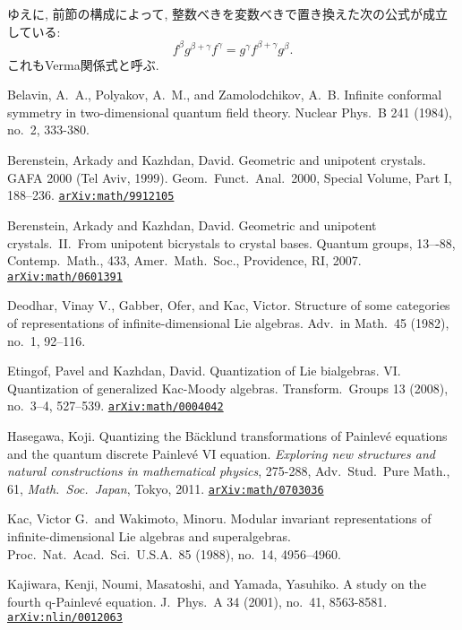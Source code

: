 \documentclass[12pt,twoside,dvipdfm]{msjproc}
\newcommand\arxivref[1]{\href{http://arxiv.org/abs/#1}{\tt arXiv:#1}}
\theoremstyle{definition} %
\theoremstyle{definition} %
\theoremstyle{definition} %
\numberwithin{theorem}{section}
\numberwithin{equation}{section}
\numberwithin{figure}{section}
\numberwithin{table}{section}
\begin{document}
ゆえに, 前節の構成によって, 
整数べきを変数べきで置き換えた次の公式が成立している:
\begin{equation*}
  f^\beta g^{\beta+\gamma} f^\gamma
 =g^\gamma f^{\beta+\gamma} g^\beta.
\end{equation*}
これもVerma関係式と呼ぶ.


\begin{thebibliography}{99}

Belavin, A.\ A., Polyakov, A.\ M., and Zamolodchikov, A.\ B. 
Infinite conformal symmetry in two-dimensional quantum field theory. 
Nuclear Phys.\ B 241 (1984), no.~2, 333-380.

Berenstein, Arkady and Kazhdan, David. 
Geometric and unipotent crystals. 
GAFA 2000 (Tel Aviv, 1999).  
Geom.\ Funct.\ Anal.\  2000,  Special Volume, Part I, 188--236.
\arxivref{math/9912105}

Berenstein, Arkady and Kazhdan, David. 
Geometric and unipotent crystals.\ II.\ 
From unipotent bicrystals to crystal bases. 
Quantum groups, 13–-88, Contemp.\ Math., 433, 
Amer.\ Math.\ Soc., Providence, RI, 2007.
\arxivref{math/0601391}

Deodhar, Vinay V., Gabber, Ofer, and Kac, Victor. 
Structure of some categories of representations 
of infinite-dimensional Lie algebras. 
Adv.\ in Math.\ 45 (1982), no.~1, 92--116.

Etingof, Pavel and Kazhdan, David. 
Quantization of Lie bialgebras. 
VI. Quantization of generalized Kac-Moody algebras. 
Transform.\ Groups 13 (2008), no.~3--4, 527--539. 
\arxivref{math/0004042}

Hasegawa, Koji.
Quantizing the B\"acklund transformations of Painlev\'e equations and 
the quantum discrete Painlev\'e VI equation. 
{\em Exploring new structures and natural constructions in mathematical physics}, 275-288, 
Adv.\ Stud.\ Pure Math., 61, {\em Math.\ Soc.\ Japan}, Tokyo, 2011.
\arxivref{math/0703036}

Kac, Victor G.\ and Wakimoto, Minoru.
Modular invariant representations of infinite-dimensional Lie algebras and superalgebras.
Proc.\ Nat.\ Acad.\ Sci.\ U.S.A.\ 85 (1988), no.~14, 4956--4960.

Kajiwara, Kenji, Noumi, Masatoshi, and Yamada, Yasuhiko.
A study on the fourth q-Painlev\'e equation.
J.\ Phys.\ A 34 (2001), no.~41, 8563-8581. 
\arxivref{nlin/0012063}


\end{thebibliography}
\end{document}
